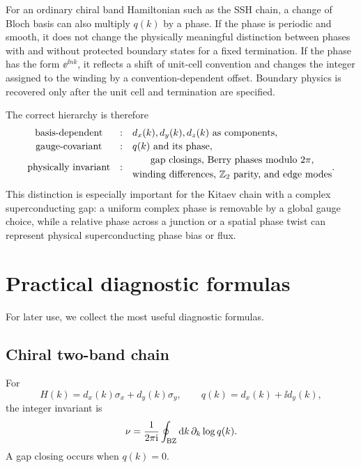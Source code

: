 For an ordinary chiral band Hamiltonian such as the SSH chain, a change of Bloch
basis can also multiply $q(k)$ by a phase.  If the phase is periodic and smooth,
it does not change the physically meaningful distinction between phases with and
without protected boundary states for a fixed termination.  If the phase has the
form $\ee^{\ii n k}$, it reflects a shift of unit-cell convention and changes the
integer assigned to the winding by a convention-dependent offset.  Boundary
physics is recovered only after the unit cell and termination are specified.

The correct hierarchy is therefore
\begin{equation}
\label{eq:topo-invariant-hierarchy}
\begin{array}{ccl}
\text{basis-dependent} &:& d_x(k),d_y(k),d_z(k)\ \text{as components},\\[2pt]
\text{gauge-covariant} &:& q(k)\ \text{and its phase},\\[2pt]
\text{physically invariant} &: &
\begin{gathered}
\text{gap closings, Berry phases modulo }2\pi,\\
\text{winding differences, }\mathbb{Z}_2\text{ parity, and edge modes}
\end{gathered}.
\end{array}
\end{equation}
This distinction is especially important for the Kitaev chain with a complex
superconducting gap: a uniform complex phase is removable by a global gauge
choice, while a relative phase across a junction or a spatial phase twist can
represent physical superconducting phase bias or flux.

\section{Practical diagnostic formulas}
\label{sec:topo-practical-diagnostics}

For later use, we collect the most useful diagnostic formulas.

\subsection*{Chiral two-band chain}
For
\begin{equation}
    H(k)=d_x(k)\sigma_x+d_y(k)\sigma_y,
    \qquad
    q(k)=d_x(k)+\ii d_y(k),
\end{equation}
the integer invariant is
\begin{equation}
\label{eq:topo-summary-chiral-winding}
    \nu=\frac{1}{2\pi\mathrm{i}}\oint_{\rm BZ}\mathrm{d} k\,\partial_k\log q(k).
\end{equation}
A gap closing occurs when $q(k)=0$.

